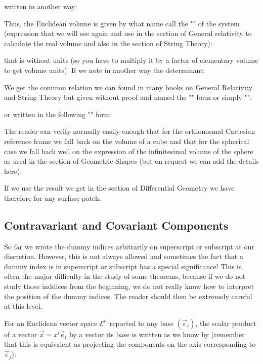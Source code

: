 	written in another way:
	
	Thus, the Euclidean volume  is given by what name call the "" of the system (expression that we will see again and use in the section of General relativity to calculate the real volume and also in the section of String Theory):
		
	that is without units (so you have to multiply it by a factor of elementary volume to get volume units). If we note in another way the determinant:
		
	We get the common relation we can found in many books on General Relativity and String Theory but given without proof and named the "" form or simply "":
		
	or written in the following "" form:
	
	The reader can verify normally easily enough that for the orthonormal Cartesian reference frame we fall back on the volume of a cube and that for the spherical case we fall back well on the expression of the infinitesimal volume of the sphere as used in the section of Geometric Shapes (but on request we can add the details here).
	
	If we use the result we get in the section of Differential Geometry we have therefore for any surface patch:
	

	
	\subsection{Contravariant and Covariant Components}\label{contravariant and covariant components}
	So far we wrote the dummy indices arbitrarily on superscript or subscript at our discretion. However, this is not always allowed and sometimes the fact that a dummy index is in superscript or subscript has a special significance! This is often the major difficulty in the study of some theorems, because if we do not study those inddices from the beginning, we do not really know how to interpret the position of the dummy indices. The reader should then be extremely careful at this level.

	For an Euclidean vector space $\mathcal{E}^n$ reported to any base $(\vec{e}_i)$, the scalar product of a vector $\vec{x}=x^i\vec{e}_i$ by a vector its base is written as we know by (remember that this is equivalent as projecting the components on the axis corresponding to $\vec{e}_j$):
	
